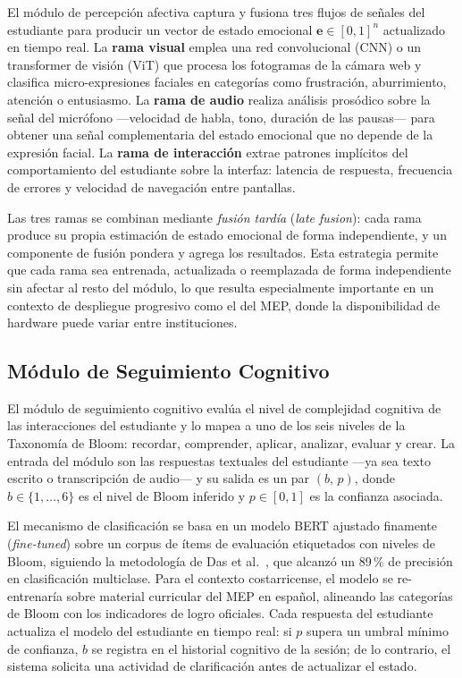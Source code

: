 El módulo de percepción afectiva captura y fusiona tres flujos de señales
del estudiante para producir un vector de estado emocional
$\mathbf{e} \in [0,1]^{n}$ actualizado en tiempo real. La \textbf{rama
visual} emplea una red convolucional (CNN) o un transformer de visión (ViT)
que procesa los fotogramas de la cámara web y clasifica micro-expresiones
faciales en categorías como frustración, aburrimiento, atención o
entusiasmo. La \textbf{rama de audio} realiza análisis prosódico sobre la
señal del micrófono ---velocidad de habla, tono, duración de las pausas---
para obtener una señal complementaria del estado emocional que no depende
de la expresión facial. La \textbf{rama de interacción} extrae patrones
implícitos del comportamiento del estudiante sobre la interfaz: latencia de
respuesta, frecuencia de errores y velocidad de navegación entre pantallas.

Las tres ramas se combinan mediante \textit{fusión tardía} (\textit{late
fusion}): cada rama produce su propia estimación de estado emocional de
forma independiente, y un componente de fusión pondera y agrega los
resultados. Esta estrategia permite que cada rama sea entrenada, actualizada
o reemplazada de forma independiente sin afectar al resto del módulo, lo
que resulta especialmente importante en un contexto de despliegue progresivo
como el del MEP, donde la disponibilidad de hardware puede variar entre
instituciones.

\subsection{Módulo de Seguimiento Cognitivo}

El módulo de seguimiento cognitivo evalúa el nivel de complejidad cognitiva
de las interacciones del estudiante y lo mapea a uno de los seis niveles de
la Taxonomía de Bloom: recordar, comprender, aplicar, analizar, evaluar y
crear. La entrada del módulo son las respuestas textuales del estudiante ---ya
sea texto escrito o transcripción de audio--- y su salida es un par
$(b,\, p)$, donde $b \in \{1,\ldots,6\}$ es el nivel de Bloom inferido y
$p \in [0,1]$ es la confianza asociada.

El mecanismo de clasificación se basa en un modelo BERT ajustado finamente
(\textit{fine-tuned}) sobre un corpus de ítems de evaluación etiquetados
con niveles de Bloom, siguiendo la metodología de Das et al.~\cite{Das2020},
que alcanzó un 89\,\% de precisión en clasificación multiclase. Para el
contexto costarricense, el modelo se re-entrenaría sobre material curricular
del MEP en español, alineando las categorías de Bloom con los indicadores de
logro oficiales. Cada respuesta del estudiante actualiza el modelo del
estudiante en tiempo real: si $p$ supera un umbral mínimo de confianza, $b$
se registra en el historial cognitivo de la sesión; de lo contrario, el
sistema solicita una actividad de clarificación antes de actualizar el
estado.

